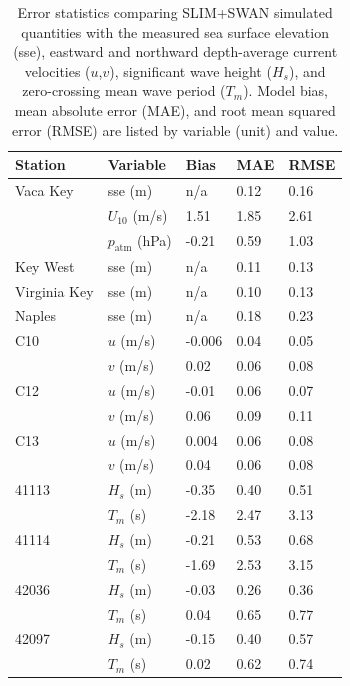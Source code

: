 \documentclass[preprint,12pt,authoryear]{elsarticle}
\begin{document}
\begin{table}
    \centering
    \begin{tabular}{|p{3cm}p{2cm}p{2cm}p{2cm}p{2cm}|}
        \hline
        \textbf{Station} & \textbf{Variable} & \textbf{Bias} & \textbf{MAE} & \textbf{RMSE} \\
        \hline
        Vaca Key     & sse (m)        & n/a  & 0.12 & 0.16 \\
                     & $U_{10}$ (m/s) & 1.51 & 1.85 & 2.61 \\
                     & $p_\text{atm}$ (hPa) & -0.21 & 0.59 & 1.03 \\ 
        Key West     & sse (m)        & n/a  & 0.11 & 0.13 \\
        Virginia Key & sse (m)        & n/a  & 0.10 & 0.13 \\
        Naples       & sse (m)        & n/a  & 0.18 & 0.23 \\
        \hline
        C10  & $u$ (m/s) & -0.006 & 0.04 & 0.05 \\
             & $v$ (m/s) & 0.02   & 0.06 & 0.08 \\
        C12  & $u$ (m/s) & -0.01  & 0.06 & 0.07 \\
             & $v$ (m/s) & 0.06   & 0.09 & 0.11 \\
        C13  & $u$ (m/s) & 0.004  & 0.06 & 0.08 \\
             & $v$ (m/s) & 0.04   & 0.06 & 0.08 \\
        \hline
        41113 & $H_s$ (m) & -0.35 & 0.40 & 0.51 \\
              & $T_m$ (s) & -2.18 & 2.47 & 3.13 \\
        41114 & $H_s$ (m) & -0.21 & 0.53 & 0.68 \\
              & $T_m$ (s) & -1.69 & 2.53 & 3.15 \\
        42036 & $H_s$ (m) & -0.03 & 0.26 & 0.36 \\
              & $T_m$ (s) & 0.04  & 0.65 & 0.77 \\
        42097 & $H_s$ (m) & -0.15 & 0.40 & 0.57 \\
              & $T_m$ (s) & 0.02  & 0.62 & 0.74 \\
        \hline
    \end{tabular}
    \caption{Error statistics comparing SLIM+SWAN simulated quantities with the measured sea surface elevation (sse), eastward and northward depth-average current velocities ($u$,$v$), significant wave height ($H_s$), and zero-crossing mean wave period ($T_m$). Model bias, mean absolute error (MAE), and root mean squared error (RMSE) are listed by variable (unit) and value.}
    \label{tab:stat}
\end{table}
\end{document}
